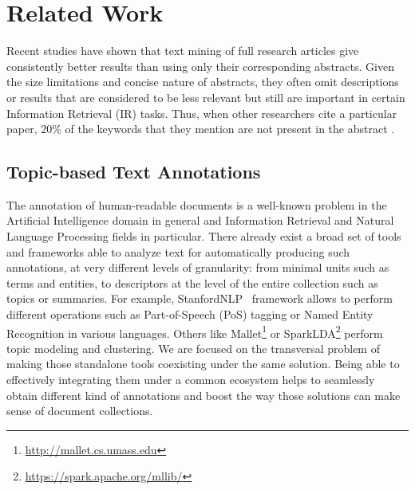 

\chapter{Related Work}\label{ch:soa}

\graphicspath{{soa/figures/}}


Recent studies \cite{Westergaard2017}\cite{Sciences2016} have shown that text mining of full research articles give consistently better results than using only their corresponding abstracts. Given the size limitations and concise nature of abstracts, they often omit descriptions or results that are considered to be less relevant but still are important in certain Information Retrieval (IR) tasks. Thus, when other researchers cite a particular paper, 20\% of the keywords that they mention are not present in the abstract \cite{Divoli2012}.



\section{Topic-based Text Annotations}

The annotation of human-readable documents is a well-known problem in the Artificial Intelligence domain in general and Information Retrieval and Natural Language Processing fields in particular. There already exist a broad set of tools and frameworks able to analyze text for automatically producing such annotations, at very different levels of granularity: from minimal units such as terms and entities, to descriptors at the level of the entire collection such as  topics or summaries. For example, StanfordNLP~\cite{Manning2014TheToolkit} framework allows to perform different operations such as Part-of-Speech (PoS) tagging or Named Entity Recognition in various languages. Others like Mallet\footnote{\url{http://mallet.cs.umass.edu}} or SparkLDA\footnote{\url{https://spark.apache.org/mllib/}} perform topic modeling and clustering. We are focused on the transversal problem of making those standalone tools coexisting under the same solution. Being able to effectively integrating  them  under a common ecosystem helps to seamlessly obtain different kind of  annotations and boost the way those solutions can make sense of document collections.  
 
